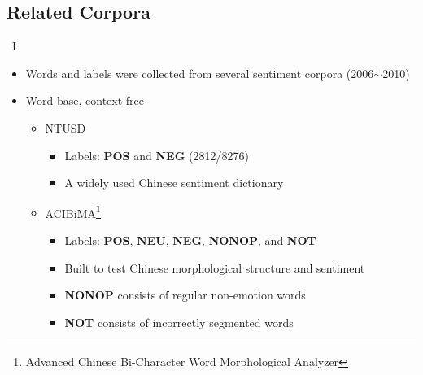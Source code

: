 \documentclass[compress]{beamer}
\begin{document}
    \subsection{Related Corpora}
        \begin{frame}{\subsecname\ I}
            \begin{itemize}
                \item Words and labels were collected from several sentiment corpora (2006$\sim$2010)
                \item Word-base, context free
                \begin{itemize}
                    \item NTUSD
                        \begin{itemize}
                            \item Labels: \textbf{POS} and \textbf{NEG} (2812/8276) 
                            \item A widely used Chinese sentiment dictionary
                        \end{itemize}
                    \item ACIBiMA\footnote{Advanced Chinese Bi-Character Word Morphological Analyzer}
                        \begin{itemize}
                            \item Labels: \textbf{POS}, \textbf{NEU}, \textbf{NEG}, \textbf{NONOP}, and \textbf{NOT}
                            \item Built to test Chinese morphological structure and sentiment
                            \item \textbf{NONOP} consists of regular non-emotion words
                            \item \textbf{NOT} consists of incorrectly segmented words
                        \end{itemize}
                \end{itemize}
            \end{itemize}
        \end{frame}
\end{document}
